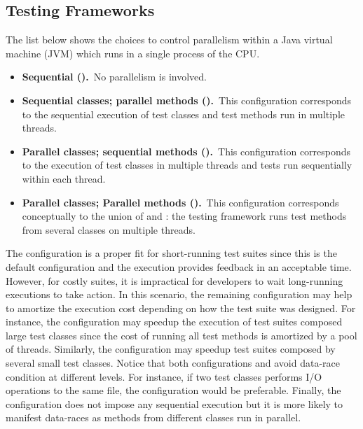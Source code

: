 \subsection{Testing Frameworks}
\label{sec:frameworks}

The list below shows the choices to control parallelism within a Java
virtual machine (JVM) which runs in a single process of the CPU.

\begin{itemize}
\item
    \textbf{Sequential (\Seq).}~No parallelism is involved.
\item
    \textbf{Sequential classes; parallel methods
        (\SeqClassParMeth).}~This configuration corresponds to the
        sequential execution of test classes and test methods run in
        multiple threads.
\item
    \textbf{Parallel classes; sequential methods
        (\ParClassSeqMeth{}).}~This configuration corresponds to the
        execution of test classes in multiple threads and tests run
        sequentially within each thread.
\item
    \textbf{Parallel classes; Parallel methods
        (\ParClassParMeth).}~This configuration corresponds
        conceptually to the union of \ParClassSeqMeth{} and
        \SeqClassParMeth{}: the testing framework runs test methods
        from several classes on multiple threads.
\end{itemize}

The configuration \Seq{} is a proper fit for short-running test suites
since this is the default configuration and the execution provides
feedback in an acceptable time. However, for costly suites, it is
impractical for developers to wait long-running executions to take
action.  In this scenario, the remaining configuration may help to
amortize the execution cost depending on how the test suite was
designed. For instance, the configuration \SeqClassParMeth{} may
speedup the execution of test suites composed large test classes since
the cost of running all test methods is amortized by a pool of
threads. Similarly, the configuration \ParClassSeqMeth{} may speedup
test suites composed by several small test classes. Notice that both
configurations \ParClassSeqMeth{} and \SeqClassParMeth{} avoid
data-race condition at different levels. For instance, if two test
classes performs I/O operations to the same file, the configuration
\SeqClassParMeth{} would be preferable. Finally, the configuration
\ParClassParMeth{} does not impose any sequential execution but it is
more likely to manifest data-races as methods from different classes
run in parallel.

